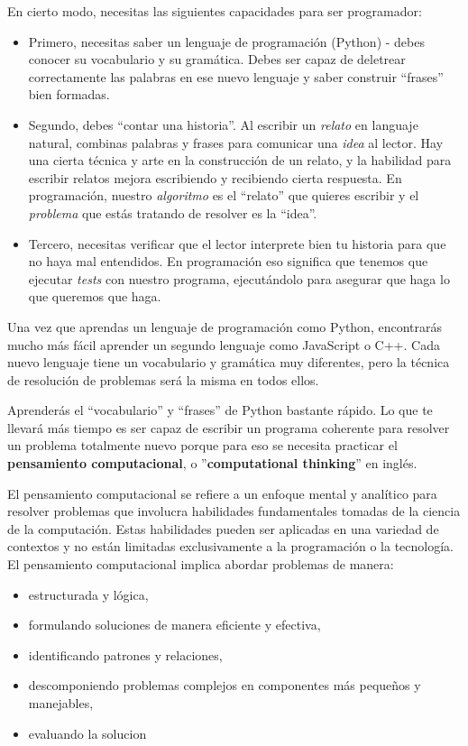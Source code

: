 En cierto modo, necesitas las siguientes capacidades para ser
programador:

\begin{itemize}[nosep]
\item
  Primero, necesitas saber un lenguaje de programación (Python) - debes
  conocer su vocabulario y su gramática. Debes ser capaz de deletrear
  correctamente las palabras en ese nuevo lenguaje y saber construir
  ``frases'' bien formadas.
\item
  Segundo, debes ``contar una historia''. Al escribir un \emph{relato}
  en languaje natural, combinas palabras y frases para comunicar una
  \emph{idea} al lector. Hay una cierta técnica y arte en la
  construcción de un relato, y la habilidad para escribir relatos mejora
  escribiendo y recibiendo cierta respuesta. En programación, nuestro
  \emph{algoritmo} es el ``relato'' que quieres escribir y el
  \emph{problema} que estás tratando de resolver es la ``idea''.
\item
  Tercero, necesitas verificar que el lector interprete bien tu historia
  para que no haya mal entendidos. En programación eso significa que
  tenemos que ejecutar {\em tests} con nuestro programa, ejecutándolo para
  asegurar que haga lo que queremos que haga.
\end{itemize}

Una vez que aprendas un lenguaje de programación como Python,
encontrarás mucho más fácil aprender un segundo lenguaje como JavaScript
o C++. Cada nuevo lenguaje tiene un vocabulario y gramática muy
diferentes, pero la técnica de resolución de problemas será la misma en
todos ellos.

Aprenderás el ``vocabulario'' y ``frases'' de Python bastante rápido. Lo que te
llevará más tiempo es ser capaz de escribir un programa coherente para
resolver un problema totalmente nuevo porque para eso se necesita practicar 
el \textbf{pensamiento computacional}, o ''\textbf{computational thinking}'' en inglés.

El pensamiento computacional se refiere a un enfoque mental y analítico para resolver problemas que involucra habilidades fundamentales tomadas de la ciencia de la computación. Estas habilidades pueden ser aplicadas en una variedad de contextos y no están limitadas exclusivamente a la programación o la tecnología. El pensamiento computacional implica abordar problemas de manera:

\begin{itemize}
\item estructurada y lógica, 
\item formulando soluciones de manera eficiente y efectiva,
\item identificando patrones y relaciones, 
\item descomponiendo problemas complejos en componentes más pequeños y manejables,
\item evaluando la solucion
\end{itemize}

